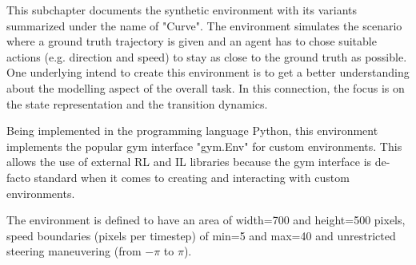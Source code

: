 This subchapter documents the synthetic environment with its variants summarized under the name of "Curve". The environment simulates the scenario where a ground truth trajectory is given and an agent has to chose suitable actions (e.g. direction and speed) to stay as close to the ground truth as possible. One underlying intend to create this environment is to get a better understanding about the modelling aspect of the overall task. In this connection, the focus is on the state representation and the transition dynamics.
\par
Being implemented in the programming language Python, this environment implements the popular gym interface "gym.Env" \cite[]{gym} for custom environments. This allows the use of external RL and IL libraries because the gym interface is de-facto standard when it comes to creating and interacting with custom environments.
\par
The environment is defined to have an area of width=700 and height=500 pixels, speed boundaries (pixels per timestep) of min=5 and max=40 and unrestricted steering maneuvering (from $-\pi$ to $\pi$).